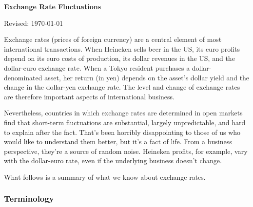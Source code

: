 \documentclass[letterpaper,12pt]{article}
\def\HeadName{Exchange Rate Fluctuations}
\begin{document}
\thispagestyle{empty}%
\Head

\centerline{\large \bf \HeadName}%
\centerline{Revised: \today}

\bigskip

Exchange rates (prices of foreign currency)
are a central element of most international transactions.
When Heineken sells beer in the US,
its euro profits depend on its euro costs of production,
its dollar revenues in the US, and the dollar-euro exchange rate.
When a Tokyo resident purchases a dollar-denominated asset,
her return (in yen) depends on the asset's dollar yield
and the change in the dollar-yen exchange rate.
The level and change of exchange rates are therefore
important aspects of international business.

Nevertheless, countries in which exchange rates are determined 
in open markets find that 
short-term fluctuations are substantial, largely unpredictable,
and hard to explain after the fact.  
That's been horribly disappointing to those of us who would like to
understand them better, but it's a fact of life.
From a business perspective, they're a source of random noise.
Heineken profits, for example, vary with the dollar-euro rate,
even if the underlying business doesn't change.  

What follows is a summary of what we know about exchange rates.  


\subsubsection*{Terminology}
\end{document}
